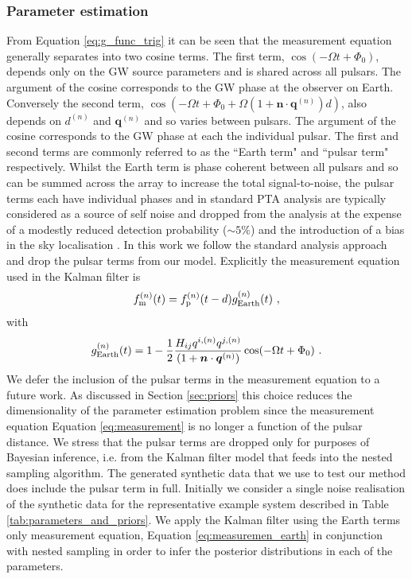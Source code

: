 \documentclass[fleqn,usenatbib,useAMS]{mnras}
\begin{document}
\subsubsection{Parameter estimation}\label{sec:parameter_estim}
From Equation \eqref{eq:g_func_trig} it can be seen that the measurement equation generally separates into two cosine terms. The first term, $\cos(-\Omega t + \Phi_0)$, depends only on the GW source parameters and is shared across all pulsars. The argument of the cosine corresponds to the GW phase at the observer on Earth.  Conversely the second term, $\cos \left(-\Omega t +\Phi_0 + \Omega \left(1 + \boldsymbol{n}\cdot \boldsymbol{q}^{(n)} \right)  d \right)$, also depends on $d^{(n)}$ and $\boldsymbol{q}^{(n)}$ and so varies between pulsars. The argument of the cosine corresponds to the GW phase at each the individual pulsar. The first and second terms are commonly referred to as the ``Earth term" and ``pulsar term" respectively. Whilst the Earth term is phase coherent between all pulsars and so can be summed across the array to increase the total signal-to-noise, the pulsar terms each have individual phases and in standard PTA analysis are typically considered as a source of self noise and dropped from the analysis \citep[e.g.][]{Sesana2010,Babak2012,Petiteau2013,Zhu2015,Taylors2016,Goldstein2018,Charisi2023arXiv230403786C} at the expense of a modestly reduced detection probability ($\sim 5 \%$) and the introduction of a bias in the sky localisation \citep{Zhupulsarterms,Chen2022}. In this work we follow the standard analysis approach and drop the pulsar terms from our model. Explicitly the measurement equation used in the Kalman filter is
\begin{equation}
		f_{\rm m}^{(n)}(t) = f_{\rm p}^{(n)}(t-d) g^{(n)}_{\rm Earth}(t) \ , 
		\label{eq:measuremen_earth}
	\end{equation}
	with
	\begin{equation}
		g^{(n)}_{\rm Earth}(t) = 1 - \frac{1}{2} \frac{ H_{ij}q^{i,(n)} q^{j,(n)}}{(1 + \boldsymbol{n}\cdot \boldsymbol{q}^{(n)}) }  \cos(-\Omega t +\Phi_0)  \ .
		\label{eq:g_func_trig_earth}
	\end{equation}
	We defer the inclusion of the pulsar terms in the measurement equation to a future work. As discussed in Section \ref{sec:priors} this choice reduces the dimensionality of the parameter estimation problem since the measurement equation Equation \eqref{eq:measurement} is no longer a function of the pulsar distance.  We stress that the pulsar terms are dropped only for purposes of Bayesian inference, i.e. from the Kalman filter model that feeds into the nested sampling algorithm. The generated synthetic data that we use to test our method does include the pulsar term in full. Initially we consider a single noise realisation of the synthetic data for the representative example system described in Table \ref{tab:parameters_and_priors}. We apply the Kalman filter using the Earth terms only measurement equation, Equation \eqref{eq:measuremen_earth} in conjunction with nested sampling in order to infer the posterior distributions in each of the parameters. \newline 
\end{document}
